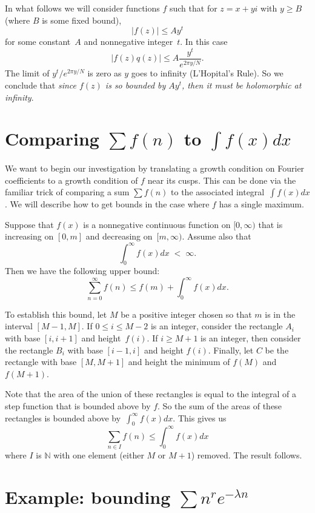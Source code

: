 \documentclass {amsart}
\theoremstyle{plain}
\theoremstyle{definition}
\theoremstyle{remark}
\newcommand{\bN}{{\mathbb{N}}}
\begin{document}
In what follows we will consider functions $f$ such that for $z = x + yi$ with $y \ge B$ (where $B$ is some fixed bound),
$$
|f(z)| \le A y^t
$$
for some constant~$A$ and nonnegative integer~$t$.
In this case 
$$
|f(z) q(z)| \le A \frac{y^t} { e^{ 2 \pi y / N}}.
$$
The limit of ${y^t} / { e^{ 2 \pi y / N}}$ is zero as $y$ goes to infinity (L'Hopital's Rule). So we conclude that
\emph{since $f(z)$ is so bounded by $A y^t$, then it must be holomorphic at infinity}.



\section {Comparing $\sum f(n)$ to $\int f(x) dx$}

We want to begin our investigation by translating a growth condition on Fourier coefficients to
a growth condition of $f$ near its cusps. This can be done via the familiar
trick of comparing a sum $\sum f(n)$ to the associated integral~$\int f(x) dx$.
We will describe how to get bounds in the case where $f$ has a single maximum.

Suppose that $f(x)$ is a nonnegative continuous function on $[0, \infty)$ that is 
increasing on $[0, m]$ and decreasing on~$[m, \infty)$. Assume also
that 
$$
\int_{0}^\infty f(x) dx \; < \; \infty.
$$
Then we have the following upper bound:
$$
\sum_{n=0}^\infty f(n) \le f(m) + \int_{0}^\infty f(x) dx.
$$

To establish this bound, let $M$ be a positive integer chosen so that $m$ is in the interval $[M - 1, M]$.
If $0 \le i \le M -2$ is an integer, consider the rectangle $A_i$ with base $[i, i + 1]$
and height~$f(i)$.
If $i \ge M + 1$ is an integer, then consider the rectangle $B_i$ with base $[i - 1, i]$
and height $f(i)$. 
Finally, let $C$ be the rectangle with base $[M, M+1]$ and height the minimum
of $f(M)$ and $f(M+1)$.

Note that the area of the union of these rectangles is equal to the integral of a step
function that is bounded above by $f$. So the sum of the areas of these rectangles
is bounded above by~$\int_{0}^\infty f(x) dx$. This gives us
$$
\sum_{n \in I} f(n) \le \int_{0}^\infty f(x) dx
$$
where $I$ is $\bN$ with one element (either $M$ or $M+1$) removed.
The result follows.


\section {Example: bounding $\sum n^r e^{-\lambda n}$}
\end{document}
